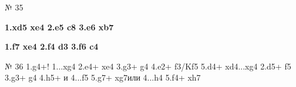 № 35 \begin{enumerate*}[label={\alph*)}] 
\item \textbf{1.\king{}xd5 \knight{}xe4 2.\rook{}e5 \bishop{}c8 3.\bishop{}e6 \bishop{}xb7\mate} 
\item \textbf{1.\queen{}f7 \bishop{}xe4 2.\queen{}f4 \king{}d3 3.\rook{}f6 \knight{}c4\mate}
\end{enumerate*}

№ 36 1.g4+! 
  1...\rook{}xg4 2.\bishop{}e4+ \rook{}xe4 3.\knight{}g3+ \king{}g4 4.\knight{}e2+ \king{}f3/Kf5 5.\knight{}d4+ \rook{}xd4...\king{}xg4 2.\bishop{}d5+ \king{}f5 3.\knight{}g3+ \king{}g4 4.\knight{}h5+ и 4...\king{}f5 5.\knight{}g7+ \rook{}xg7\mate или 4...\king{}h4 5.\knight{}f4+ \rook{}xh7\mate